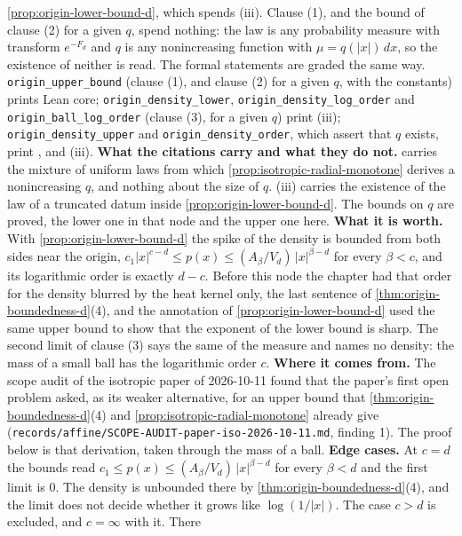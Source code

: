 \begin{proposition}
{\ref{prop:origin-lower-bound-d}, which spends (iii). Clause (1), and the bound of
clause (2) for a given $q$, spend nothing: the law is any probability measure with transform
$e^{-F_d}$ and $q$ is any nonincreasing function with $\mu = q(|x|)\,dx$, so the existence of
neither is read. The formal statements are graded the same way. \texttt{origin\_upper\_bound}
(clause (1), and clause (2) for a given $q$, with the constants) prints Lean core;
\texttt{origin\_density\_lower}, \texttt{origin\_density\_log\_order} and
\texttt{origin\_ball\_log\_order} (clause (3), for a given $q$) print (iii);
\texttt{origin\_density\_upper} and \texttt{origin\_density\_order}, which assert that $q$ exists,
print ,  and (iii). \textbf{What the citations carry and what they
do not.}  carries the mixture of uniform laws from which
\ref{prop:isotropic-radial-monotone} derives a nonincreasing $q$, and nothing about the size of
$q$. (iii) carries the existence of the law of a truncated datum inside
\ref{prop:origin-lower-bound-d}. The bounds on $q$ are proved, the lower one in that node and the
upper one here. \textbf{What it is
worth.} With \ref{prop:origin-lower-bound-d} the spike of the density is bounded from both sides
near the origin, $c_1|x|^{c-d} \le p(x) \le (A_\beta/V_d)\,|x|^{\beta-d}$ for every $\beta < c$,
and its logarithmic order is exactly $d - c$. Before this node the chapter had that order for the
density blurred by the heat kernel only, the last sentence of \ref{thm:origin-boundedness-d}(4),
and the annotation of \ref{prop:origin-lower-bound-d} used the same upper bound to show that the
exponent of the lower bound is sharp. The second limit of clause (3) says the same of the measure
and names no density: the mass of a small ball has the logarithmic order $c$. \textbf{Where it
comes from.} The scope audit of the isotropic paper of 2026-10-11 found that the paper's first
open problem asked, as its weaker alternative, for an upper bound that
\ref{thm:origin-boundedness-d}(4) and \ref{prop:isotropic-radial-monotone} already give
(\texttt{records/affine/SCOPE-AUDIT-paper-iso-2026-10-11.md}, finding 1). The proof below is that
derivation, taken through the mass of a ball. \textbf{Edge cases.} At $c = d$ the bounds read
$c_1 \le p(x) \le (A_\beta/V_d)\,|x|^{\beta-d}$ for every $\beta < d$ and the first limit is $0$.
The density is unbounded there by \ref{thm:origin-boundedness-d}(4), and the limit does not decide
whether it grows like $\log(1/|x|)$. The case $c > d$ is excluded, and $c = \infty$ with it. There
}
\end{proposition}
